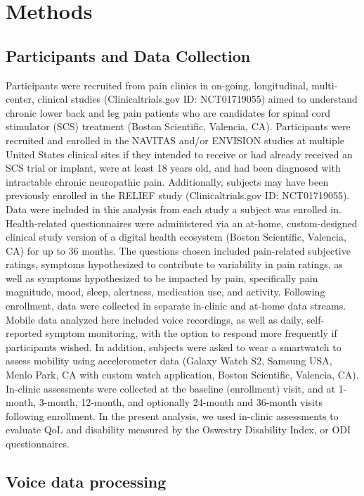 \documentclass[conference]{IEEEtran}
\begin{document}
\section{Methods}

\subsection{Participants and Data Collection}

Participants were recruited from pain clinics in on-going, longitudinal, multi-center, clinical studies (Clinicaltrials.gov ID: NCT01719055) aimed to understand chronic lower back and leg pain patients who are candidates for spinal cord stimulator (SCS) treatment (Boston Scientific, Valencia, CA). Participants were recruited and enrolled in the NAVITAS and/or ENVISION studies at multiple United States clinical sites if they intended to receive or had already received an SCS trial or implant, were at least 18 years old, and had been diagnosed with intractable chronic neuropathic pain. Additionally, subjects may have been previously enrolled in the RELIEF study (Clinicaltrials.gov ID: NCT01719055). Data were included in this analysis from each study a subject was enrolled in. Health-related questionnaires were administered via an at-home, custom-designed clinical study version of a digital health ecosystem (Boston Scientific, Valencia, CA) for up to 36 months. The questions chosen included pain-related subjective ratings, symptoms hypothesized to contribute to variability in pain ratings, as well as symptoms hypothesized to be impacted by pain, specifically pain magnitude, mood, sleep, alertness, medication use, and activity. Following enrollment, data were collected in separate in-clinic and at-home data streams. Mobile data analyzed here included voice recordings, as well as daily, self-reported symptom monitoring, with the option to respond more frequently if participants wished. In addition, subjects were asked to wear a smartwatch to assess mobility using accelerometer data (Galaxy Watch S2, Samsung USA, Menlo Park, CA with custom watch application, Boston Scientific, Valencia, CA). In-clinic assessments were collected at the baseline (enrollment) visit, and at 1-month, 3-month, 12-month, and optionally 24-month and 36-month visits following enrollment. In the present analysis, we used in-clinic assessments to evaluate QoL \cite{Group1990} and disability measured by the Oswestry Disability Index, or ODI \cite{Fairbank2000} questionnaires. 

\subsection{Voice data processing}
\end{document}
